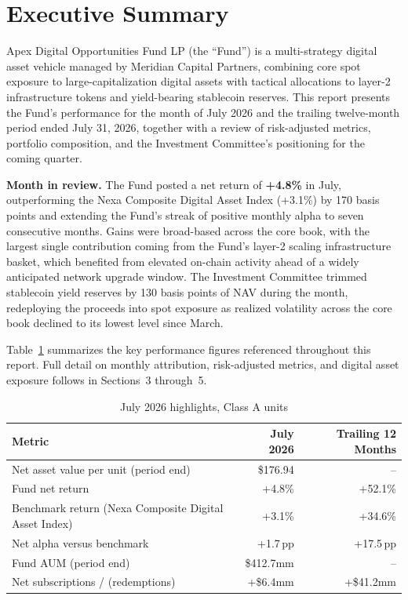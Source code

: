 \section{Executive Summary}

Apex Digital Opportunities Fund LP (the ``Fund'') is a multi-strategy digital asset vehicle managed by Meridian Capital Partners, combining core spot exposure to large-capitalization digital assets with tactical allocations to layer-2 infrastructure tokens and yield-bearing stablecoin reserves. This report presents the Fund's performance for the month of July 2026 and the trailing twelve-month period ended July 31, 2026, together with a review of risk-adjusted metrics, portfolio composition, and the Investment Committee's positioning for the coming quarter.

\begin{thesisbox}
\textbf{Month in review.} The Fund posted a net return of \textbf{+4.8\%} in July, outperforming the Nexa Composite Digital Asset Index (+3.1\%) by 170 basis points and extending the Fund's streak of positive monthly alpha to seven consecutive months. Gains were broad-based across the core book, with the largest single contribution coming from the Fund's layer-2 scaling infrastructure basket, which benefited from elevated on-chain activity ahead of a widely anticipated network upgrade window. The Investment Committee trimmed stablecoin yield reserves by 130 basis points of NAV during the month, redeploying the proceeds into spot exposure as realized volatility across the core book declined to its lowest level since March.
\end{thesisbox}

Table~\ref{tab:month-highlights} summarizes the key performance figures referenced throughout this report. Full detail on monthly attribution, risk-adjusted metrics, and digital asset exposure follows in Sections~3 through~5.

\begin{table}[H]
\centering
\small
\caption{July 2026 highlights, Class A units}
\label{tab:month-highlights}
\begin{tabular}{@{}lrr@{}}
\toprule
\textbf{Metric} & \textbf{July 2026} & \textbf{Trailing 12 Months} \\
\midrule
Net asset value per unit (period end) & \$176.94 & -- \\
Fund net return & +4.8\% & +52.1\% \\
Benchmark return (Nexa Composite Digital Asset Index) & +3.1\% & +34.6\% \\
Net alpha versus benchmark & +1.7\,pp & +17.5\,pp \\
Fund AUM (period end) & \$412.7mm & -- \\
Net subscriptions / (redemptions) & +\$6.4mm & +\$41.2mm \\
\bottomrule
\end{tabular}
\end{table}

